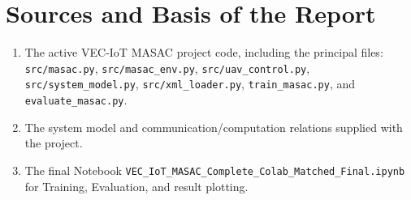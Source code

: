 \documentclass[a4paper,12pt]{article}
\newcommand{\code}[1]{\texttt{#1}}
\newcommand{\codepath}[1]{\nolinkurl{#1}}
\begin{document}
\newpage
\appendix

\section*{Sources and Basis of the Report}
\begin{enumerate}
    \item The active VEC-IoT MASAC project code, including the principal files:\\
    \codepath{src/masac.py}, \codepath{src/masac_env.py}, \codepath{src/uav_control.py},
    \codepath{src/system_model.py}, \codepath{src/xml_loader.py}, \codepath{train_masac.py}, and \codepath{evaluate_masac.py}.
    \item The system model and communication/computation relations supplied with the project.
    \item The final Notebook \code{VEC\_IoT\_MASAC\_Complete\_Colab\_Matched\_Final.ipynb} for Training, Evaluation, and result plotting.
\end{enumerate}
\end{document}
